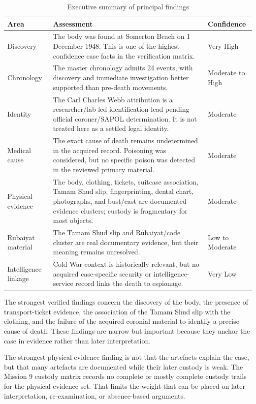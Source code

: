 \begin{table}[htbp]
\centering
\caption{Executive summary of principal findings}
\label{tab:executive-summary-findings}
\begin{tabularx}{\textwidth}{p{}X p{}}
\toprule
Area & Assessment & Confidence \\
\midrule
Discovery & The body was found at Somerton Beach on 1 December 1948. This is one of the highest-confidence case facts in the verification matrix. & Very High \\
Chronology & The master chronology admits 24 events, with discovery and immediate investigation better supported than pre-death movements. & Moderate to High \\
Identity & The Carl Charles Webb attribution is a researcher/lab-led identification lead pending official coroner/SAPOL determination. It is not treated here as a settled legal identity. & Moderate \\
Medical cause & The exact cause of death remains undetermined in the acquired record. Poisoning was considered, but no specific poison was detected in the reviewed primary material. & Moderate \\
Physical evidence & The body, clothing, tickets, suitcase association, Tamam Shud slip, fingerprinting, dental chart, photographs, and bust/cast are documented evidence clusters; custody is fragmentary for most objects. & Moderate \\
Rubaiyat material & The Tamam Shud slip and Rubaiyat/code cluster are real documentary evidence, but their meaning remains unresolved. & Low to Moderate \\
Intelligence linkage & Cold War context is historically relevant, but no acquired case-specific security or intelligence-service record links the death to espionage. & Very Low \\
\bottomrule
\end{tabularx}
\end{table}

The strongest verified findings concern the discovery of the body, the presence of transport-ticket evidence, the association of the Tamam Shud slip with the clothing, and the failure of the acquired coronial material to identify a precise cause of death. These findings are narrow but important because they anchor the case in evidence rather than later interpretation.

The strongest physical-evidence finding is not that the artefacts explain the case, but that many artefacts are documented while their later custody is weak. The Mission 9 custody matrix records no complete or mostly complete custody trails for the physical-evidence set. That limits the weight that can be placed on later interpretation, re-examination, or absence-based arguments.

